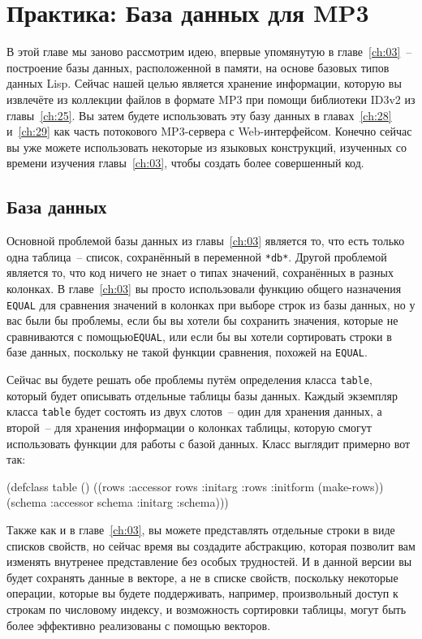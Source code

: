 \chapter{Практика: База данных для MP3}
\label{ch:27}

В этой главе мы заново рассмотрим идею, впервые упомянутую в главе~\ref{ch:03}~--
построение базы данных, расположенной в памяти, на основе базовых типов данных Lisp.
Сейчас нашей целью является хранение информации, которую вы извлечёте из коллекции файлов
в формате MP3 при помощи библиотеки ID3v2 из главы~\ref{ch:25}.  Вы затем будете
использовать эту базу данных в главах~\ref{ch:28} и~\ref{ch:29} как часть потокового
MP3-сервера с Web-интерфейсом.  Конечно сейчас вы уже можете использовать некоторые из
языковых конструкций, изученных со времени изучения главы~\ref{ch:03}, чтобы создать более
совершенный код.

\section{База данных}

Основной проблемой базы данных из главы~\ref{ch:03} является то, что есть только одна
таблица~-- список, сохранённый в переменной \lstinline{*db*}.  Другой проблемой является то,
что код ничего не знает о типах значений, сохранённых в разных колонках.  В
главе~\ref{ch:03} вы просто использовали функцию общего назначения \lstinline{EQUAL} для
сравнения значений в колонках при выборе строк из базы данных, но у вас были бы проблемы,
если бы вы хотели бы сохранить значения, которые не сравниваются с помощью\lstinline{EQUAL},
или если бы вы хотели сортировать строки в базе данных, поскольку не такой функции
сравнения, похожей на \lstinline{EQUAL}.

Сейчас вы будете решать обе проблемы путём определения класса \lstinline{table}, который будет
описывать отдельные таблицы базы данных.  Каждый экземпляр класса \lstinline{table} будет
состоять из двух слотов~-- один для хранения данных, а второй~-- для хранения информации о
колонках таблицы, которую смогут использовать функции для работы с базой данных.  Класс
выглядит примерно вот так:

\begin{myverb}
(defclass table ()
  ((rows   :accessor rows   :initarg :rows :initform (make-rows))
   (schema :accessor schema :initarg :schema)))
\end{myverb}

Также как и в главе~\ref{ch:03}, вы можете представлять отдельные строки в виде списков
свойств, но сейчас время вы создадите абстракцию, которая позволит вам изменять внутренее
представление без особых трудностей. И в данной версии вы будет сохранять данные в
векторе, а не в списке свойств, поскольку некоторые операции, которые вы будете
поддерживать, например, произвольный доступ к строкам по числовому индексу, и возможность
сортировки таблицы, могут быть более эффективно реализованы с помощью векторов.

